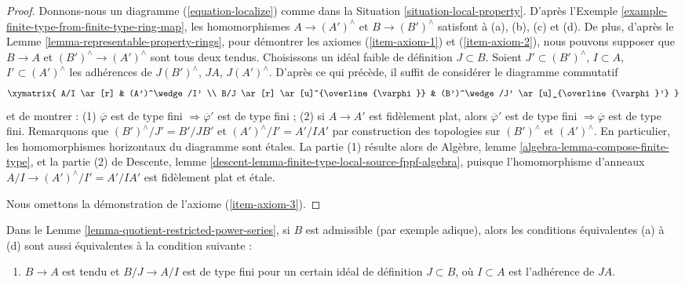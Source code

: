 \begin{proof}
\medskip\noindent
Donnons-nous un diagramme (\ref{equation-localize}) comme dans la
Situation \ref{situation-local-property}.
D'après l'Exemple \ref{example-finite-type-from-finite-type-ring-map},
les homomorphismes $A \to (A')^\wedge$ et $B \to (B')^\wedge$
satisfont à (a), (b), (c) et (d). De plus, d'après le
Lemme \ref{lemma-representable-property-rings},
pour démontrer les axiomes (\ref{item-axiom-1}) et (\ref{item-axiom-2}),
nous pouvons supposer que $B \to A$ et $(B')^\wedge \to (A')^\wedge$
sont tous deux tendus. Choisissons un idéal faible de définition $J \subset B$. Soient
$J' \subset (B')^\wedge$, $I \subset A$, $I' \subset (A')^\wedge$
les adhérences de $J(B')^\wedge$, $JA$, $J(A')^\wedge$.
D'après ce qui précède, il suffit de considérer le
diagramme commutatif
$$
\xymatrix{
A/I \ar[r] & (A')^\wedge/I' \\
B/J \ar[r] \ar[u]^{\overline{\varphi}} &
(B')^\wedge/J' \ar[u]_{\overline{\varphi}'}
}
$$
et de montrer : (1) $\overline{\varphi}$ est de type fini
$\Rightarrow \overline{\varphi}'$ est de type fini ; (2) si
$A \to A'$ est fidèlement plat, alors
$\overline{\varphi}'$ est de type fini $\Rightarrow \overline{\varphi}$
est de type fini. Remarquons que $(B')^\wedge/J' = B'/JB'$ et
$(A')^\wedge/I' = A'/IA'$ par construction des topologies sur
$(B')^\wedge$ et $(A')^\wedge$. En particulier, les homomorphismes horizontaux
du diagramme sont étales. La partie (1) résulte alors de
Algèbre, lemme \ref{algebra-lemma-compose-finite-type},
et la partie (2) de
Descente, lemme \ref{descent-lemma-finite-type-local-source-fppf-algebra},
puisque l'homomorphisme d'anneaux $A/I \to (A')^\wedge/I' = A'/IA'$ est fidèlement plat
et étale.

\medskip\noindent
Nous omettons la démonstration de l'axiome (\ref{item-axiom-3}).
\end{proof}

\begin{lemma}
\label{lemma-quotient-restricted-power-series-admissible}
Dans le Lemme \ref{lemma-quotient-restricted-power-series},
si $B$ est admissible (par exemple adique), alors les conditions équivalentes
(a) à (d) sont aussi équivalentes à la condition suivante :
\begin{enumerate}
\item[(e)] $B \to A$ est tendu et $B/J \to A/I$ est de type fini pour
un certain idéal de définition $J \subset B$, où $I \subset A$ est
l'adhérence de $JA$.
\end{enumerate}
\end{lemma}

